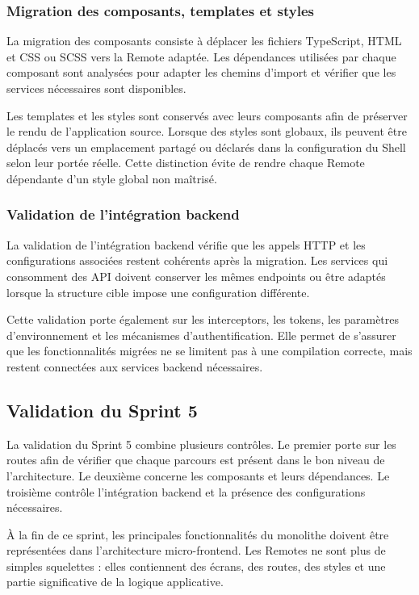 \subsubsection{Migration des composants, templates et styles}

La migration des composants consiste à déplacer les fichiers TypeScript, HTML et CSS ou SCSS vers la Remote adaptée. Les dépendances utilisées par chaque composant sont analysées pour adapter les chemins d'import et vérifier que les services nécessaires sont disponibles.

Les templates et les styles sont conservés avec leurs composants afin de préserver le rendu de l'application source. Lorsque des styles sont globaux, ils peuvent être déplacés vers un emplacement partagé ou déclarés dans la configuration du Shell selon leur portée réelle. Cette distinction évite de rendre chaque Remote dépendante d'un style global non maîtrisé.

\subsubsection{Validation de l'intégration backend}

La validation de l'intégration backend vérifie que les appels HTTP et les configurations associées restent cohérents après la migration. Les services qui consomment des API doivent conserver les mêmes endpoints ou être adaptés lorsque la structure cible impose une configuration différente.

Cette validation porte également sur les interceptors, les tokens, les paramètres d'environnement et les mécanismes d'authentification. Elle permet de s'assurer que les fonctionnalités migrées ne se limitent pas à une compilation correcte, mais restent connectées aux services backend nécessaires.

\subsection{Validation du Sprint 5}

La validation du Sprint 5 combine plusieurs contrôles. Le premier porte sur les routes afin de vérifier que chaque parcours est présent dans le bon niveau de l'architecture. Le deuxième concerne les composants et leurs dépendances. Le troisième contrôle l'intégration backend et la présence des configurations nécessaires.

À la fin de ce sprint, les principales fonctionnalités du monolithe doivent être représentées dans l'architecture micro-frontend. Les Remotes ne sont plus de simples squelettes : elles contiennent des écrans, des routes, des styles et une partie significative de la logique applicative.


